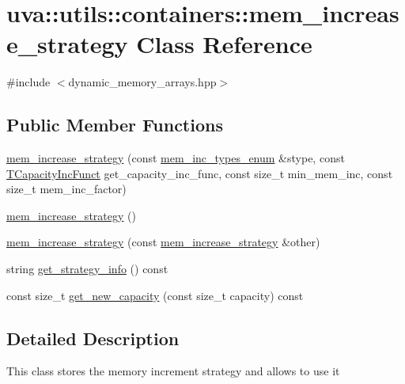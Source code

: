 \hypertarget{classuva_1_1utils_1_1containers_1_1mem__increase__strategy}{}\section{uva\+:\+:utils\+:\+:containers\+:\+:mem\+\_\+increase\+\_\+strategy Class Reference}
\label{classuva_1_1utils_1_1containers_1_1mem__increase__strategy}


{\ttfamily \#include $<$dynamic\+\_\+memory\+\_\+arrays.\+hpp$>$}

\subsection*{Public Member Functions}
\begin{DoxyCompactItemize}
\item 
\hyperlink{classuva_1_1utils_1_1containers_1_1mem__increase__strategy_ae4f60525eebcba5fe62e871fb91b3d2d}{mem\+\_\+increase\+\_\+strategy} (const \hyperlink{namespaceuva_1_1utils_1_1containers_a2dfd5027e0c656e7b8433760967da62d}{mem\+\_\+inc\+\_\+types\+\_\+enum} \&stype, const \hyperlink{namespaceuva_1_1utils_1_1containers_ab6acd1b6093503e17f6d8b942e9fccf1}{T\+Capacity\+Inc\+Funct} get\+\_\+capacity\+\_\+inc\+\_\+func, const size\+\_\+t min\+\_\+mem\+\_\+inc, const size\+\_\+t mem\+\_\+inc\+\_\+factor)
\item 
\hyperlink{classuva_1_1utils_1_1containers_1_1mem__increase__strategy_a912249f9c54674d2963a56069ae2733c}{mem\+\_\+increase\+\_\+strategy} ()
\item 
\hyperlink{classuva_1_1utils_1_1containers_1_1mem__increase__strategy_adf5440cfd95aafb6551e846321b3c764}{mem\+\_\+increase\+\_\+strategy} (const \hyperlink{classuva_1_1utils_1_1containers_1_1mem__increase__strategy}{mem\+\_\+increase\+\_\+strategy} \&other)
\item 
string \hyperlink{classuva_1_1utils_1_1containers_1_1mem__increase__strategy_a139b7e3cc3231660800f698625c875bd}{get\+\_\+strategy\+\_\+info} () const 
\item 
const size\+\_\+t \hyperlink{classuva_1_1utils_1_1containers_1_1mem__increase__strategy_a35282eca175b4d34dae20dd77390ab8a}{get\+\_\+new\+\_\+capacity} (const size\+\_\+t capacity) const 
\end{DoxyCompactItemize}


\subsection{Detailed Description}
This class stores the memory increment strategy and allows to use it 

